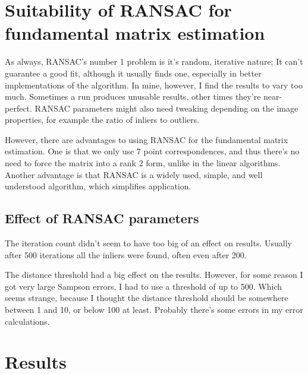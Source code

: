 



\section{Suitability of RANSAC for fundamental matrix estimation}

As always, RANSAC's number 1 problem is it's random, iterative nature; It can't
guarantee a good fit, although it usually finds one, especially in better
implementations of the algorithm. In mine, however, I find the results to vary
too much. Sometimes a run produces unusable results, other times they're
near-perfect. RANSAC parameters might also need tweaking depending on the image
properties, for example the ratio of inliers to outliers.

However, there are advantages to using RANSAC for the fundamental matrix
estimation. One is that we only use 7 point correspondences, and thus there's
no need to force the matrix into a rank 2 form, unlike in the linear
algorithms. Another advantage is that RANSAC is a widely used, simple, and well
understood algorithm, which simplifies application.

\subsection{Effect of RANSAC parameters}

The iteration count didn't seem to have too big of an effect on results.
Usually after 500 iterations all the inliers were found, often even after 200.

The distance threshold had a big effect on the results. However, for some
reason I got very large Sampson errors, I had to use a threshold of up to 500.
Which seems strange, because I thought the distance threshold should be
somewhere between 1 and 10, or below 100 at least. Probably there's some errors
in my error calculations.

\section{Results}


